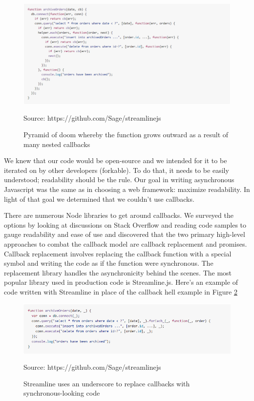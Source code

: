 \documentclass[pageno]{jpaper}
\newcommand{\source}[1]{\caption*{Source: {#1}} }
\begin{document}
\begin{figure}[h]
\begin{center}
\includegraphics[scale=0.5] {callback-hell}
\caption{Pyramid of doom whereby the function grows outward as a result of many nested callbacks}
\label{fig:callback-hell}
\source{https://github.com/Sage/streamlinejs}
\end{center}
\end{figure}

We knew that our code would be open-source and we intended for it to be iterated on by other developers (forkable). To do that, it needs to be easily understood; readability should be the rule. Our goal in writing asynchronous Javascript was the same as in choosing a web framework: maximize readability. In light of that goal we determined that we couldn't use callbacks. 

There are numerous Node libraries to get around callbacks. We surveyed the options by looking at discussions on Stack Overflow and reading code samples to gauge readability and ease of use and discovered that the two primary high-level approaches to combat the callback model are callback replacement and promises. Callback replacement involves replacing the callback function with a special symbol and writing the code as if the function were synchronous. The replacement library handles the asynchronicity behind the scenes. The most popular library used in production code is Streamline.js. Here's an example of code written with Streamline in place of the callback hell example in Figure \ref{fig:callback-hell}

\begin{figure}[h]
\begin{center}
\includegraphics[scale=0.5] {streamline}
\caption{Streamline uses an underscore to replace callbacks with synchronous-looking code}
\label{fig:callback-hell}
\source{https://github.com/Sage/streamlinejs}
\end{center}
\end{figure}
\end{document}
